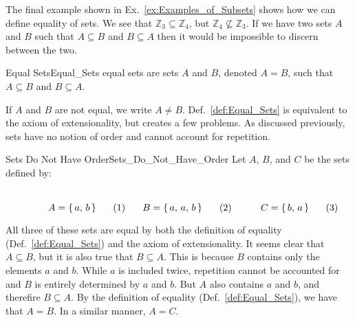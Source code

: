         The final example shown in Ex.~\ref{ex:Examples_of_Subsets}
        shows how we can define equality of sets. We see that
        $\mathbb{Z}_{3}\subseteq\mathbb{Z}_{4}$, but
        $\mathbb{Z}_{4}\nsubseteq\mathbb{Z}_{3}$. If we have two sets
        $A$ and $B$ such that $A\subseteq{B}$ and $B\subseteq{A}$ then
        it would be impossible to discern between the two.
        \begin{fdefinition}{Equal Sets}{Equal_Sets}
            \Glspl{equal set} are \glspl{set} $A$ and $B$, denoted $A=B$,
            such that $A\subseteq{B}$ and $B\subseteq{A}$.
        \end{fdefinition}
        If $A$ and $B$ are not equal, we write $A\ne{B}$.
        Def.~\ref{def:Equal_Sets} is equivalent to the axiom of
        extensionality, but creates a few problems. As discussed
        previously, sets have no notion of order and cannot account
        for repetition.
        \begin{fexample}{Sets Do Not Have Order}{Sets_Do_Not_Have_Order}
            Let $A$, $B$, and $C$ be the sets defined by:
            \par
            \begin{subequations}
                \begin{minipage}[b]{0.32\textwidth}
                    \begin{equation}
                        A=\{\,a,\,b\,\}
                    \end{equation}
                \end{minipage}
                \hfill
                \begin{minipage}[b]{0.32\textwidth}
                    \begin{equation}
                        B=\{\,a,\,a,\,b\,\}
                    \end{equation}
                \end{minipage}
                \hfill
                \begin{minipage}[b]{0.32\textwidth}
                    \begin{equation}
                        C=\{\,b,\,a\,\}
                    \end{equation}
                \end{minipage}
            \end{subequations}
            \par\vspace{2.5ex}
            All three of these sets are equal by both the definition of
            equality (Def.~\ref{def:Equal_Sets}) and the axiom of
            extensionality. It seems clear that $A\subseteq{B}$, but it is
            also true that $B\subseteq{A}$. This is because $B$ contains only
            the elements $a$ and $b$. While $a$ is included twice,
            repetition cannot be accounted for and $B$ is entirely
            determined by $a$ and $b$. But $A$ also contains $a$ and $b$, and
            therefire $B\subseteq{A}$. By the definition of equality
            (Def.~\ref{def:Equal_Sets}), we have that $A=B$. In a similar
            manner, $A=C$.
        \end{fexample}
